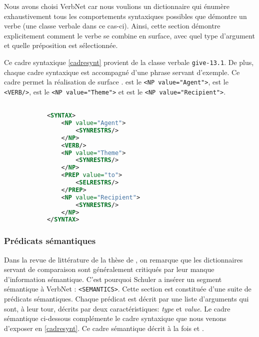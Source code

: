 Nous avons choisi VerbNet car nous voulions un dictionnaire qui énumère exhaustivement tous les comportements syntaxiques possibles que démontre un verbe (une classe verbale dans ce cas-ci). Ainsi, cette section démontre explicitement comment le verbe se combine en surface, avec quel type d'argument et quelle préposition est sélectionnée.

Ce cadre syntaxique  \ref{cadresynt} provient de la classe verbale \texttt{give-13.1}. De plus, chaque cadre syntaxique est accompagné d'une phrase servant d'exemple. Ce cadre permet la réalisation de surface .  est le \lstinline{<NP value="Agent">},  est le \lstinline{<VERB/>},  est le \lstinline{<NP value="Theme">} et  est le \lstinline{<NP value="Recipient">}.

\begin{lstlisting}[language=Xml, caption = cadres syntaxiques, label=cadresynt]

            <SYNTAX>
                <NP value="Agent">
                    <SYNRESTRS/>
                </NP>
                <VERB/>
                <NP value="Theme">
                    <SYNRESTRS/>
                </NP>
                <PREP value="to">
                    <SELRESTRS/>
                </PREP>
                <NP value="Recipient">
                    <SYNRESTRS/>
                </NP>
            </SYNTAX>
\end{lstlisting}

\subsubsection{Prédicats sémantiques}
Dans la revue de littérature de la thèse de \cite{SchulerVerbnetBroadcoverageComprehensive2005}, on remarque que les dictionnaires servant de comparaison sont généralement critiqués par leur manque d'information sémantique. C'est pourquoi Schuler a insérer un segment sémantique à VerbNet : \lstinline{<SEMANTICS>}. Cette section est constituée d'une suite de prédicats sémantiques. Chaque prédicat est décrit par une liste d'arguments qui sont, à leur tour, décrits par deux caractéristiques: \emph{type} et \emph{value}.  Le cadre sémantique ci-dessous complémente le cadre syntaxique que nous venons d'exposer en \ref{cadresynt}. Ce cadre sémantique décrit à la fois  et .

